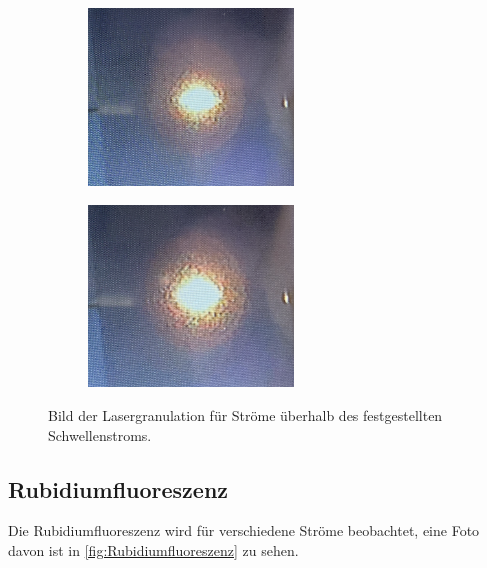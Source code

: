 \begin{figure}
    \begin{subfigure}[c]{0.5\textwidth}
        \centering
        \includegraphics[width=0.6\textwidth]{content/pics/34mA.png}
    
    \end{subfigure}
    \begin{subfigure}[c]{0.5\textwidth}
        \centering
        \includegraphics[width=0.6\textwidth]{content/pics/35mA.png}
    \end{subfigure}
    \caption{Bild der Lasergranulation für Ströme überhalb des festgestellten Schwellenstroms.}
    \label{fig:lasergranulation_2}
\end{figure}


\subsection{Rubidiumfluoreszenz}
Die Rubidiumfluoreszenz wird für verschiedene Ströme beobachtet, eine Foto davon ist in \autoref{fig:Rubidiumfluoreszenz} zu sehen.

